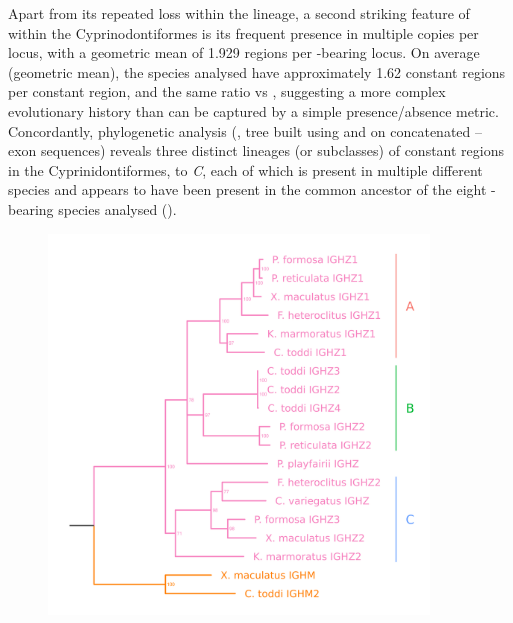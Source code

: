 Apart from its repeated loss within the lineage, a second striking feature of  within the Cyprinodontiformes is its frequent presence in multiple copies per \igh{} locus, with a geometric mean of 1.929 regions per -bearing locus. On average (geometric mean), the species analysed have approximately 1.62  constant regions per  constant region, and the same ratio vs , suggesting a more complex evolutionary history than can be captured by a simple presence/absence metric. Concordantly, phylogenetic analysis (, tree built using  and  on concatenated -- exon sequences) reveals three distinct lineages (or subclasses) of  constant regions in the Cyprinidontiformes,  to \textit{C}, each of which is present in multiple different species and appears to have been present in the common ancestor of the eight -bearing species analysed ().

\begin{figure}
	\centering
	\includegraphics[width=0.9\textwidth]{_Figures/png/multispecies-cz-tree}
	\label{fig:multispecies-cz-tree}
\end{figure}

